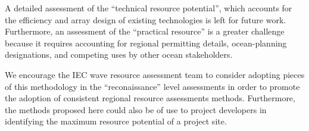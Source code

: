 A detailed assessment of the ``technical resource potential'', which accounts for the efficiency and array design of existing technologies is left for future work. Furthermore, an assessment of the ``practical resource'' is a greater challenge because it requires accounting for regional permitting details, ocean-planning designations, and competing uses by other ocean stakeholders.

We encourage the IEC wave resource assessment team to consider adopting pieces of this methodology in the ``reconaissance'' level assessments in order to promote the adoption of consistent regional resource assessments methods. Furthermore, the methods proposed here could also be of use to project developers in identifying the maximum resource potential of a project site.



